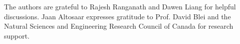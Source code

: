 
The authors are grateful to Rajesh Ranganath and Dawen Liang for helpful discussions. Jaan Altosaar expresses gratitude to Prof. David Blei and the Natural Sciences and Engineering Research Council of Canada for research support.